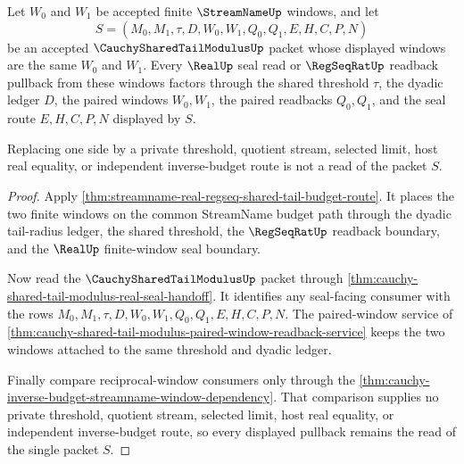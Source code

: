 \begin{theorem}
\label{thm:streamname-shared-tail-window-pullback-exactness}
Let $W_0$ and $W_1$ be accepted finite $\StreamNameUp$ windows, and let
$$
S=(M_0,M_1,\tau,D,W_0,W_1,Q_0,Q_1,E,H,C,P,N)
$$
be an accepted $\CauchySharedTailModulusUp$ packet whose displayed windows are
the same $W_0$ and $W_1$. Every $\RealUp$ seal read or $\RegSeqRatUp$ readback
pullback from these windows factors through the shared threshold $\tau$, the
dyadic ledger $D$, the paired windows $W_0,W_1$, the paired readbacks
$Q_0,Q_1$, and the seal route $E,H,C,P,N$ displayed by $S$.

Replacing one side by a private threshold, quotient stream, selected limit,
host real equality, or independent inverse-budget route is not a read of the
packet $S$.
\end{theorem}
\begin{proof}
Apply \autoref{thm:streamname-real-regseq-shared-tail-budget-route}. It places
the two finite windows on the common StreamName budget path through the dyadic
tail-radius ledger, the shared threshold, the $\RegSeqRatUp$ readback boundary,
and the $\RealUp$ finite-window seal boundary.

Now read the $\CauchySharedTailModulusUp$ packet through
\autoref{thm:cauchy-shared-tail-modulus-real-seal-handoff}. It identifies any
seal-facing consumer with the rows
$M_0,M_1,\tau,D,W_0,W_1,Q_0,Q_1,E,H,C,P,N$. The paired-window service of
\autoref{thm:cauchy-shared-tail-modulus-paired-window-readback-service} keeps
the two windows attached to the same threshold and dyadic ledger.

Finally compare reciprocal-window consumers only through the
\autoref{thm:cauchy-inverse-budget-streamname-window-dependency}. That
comparison supplies no private threshold, quotient stream, selected limit, host
real equality, or independent inverse-budget route, so every displayed pullback
remains the read of the single packet $S$.
\end{proof}

